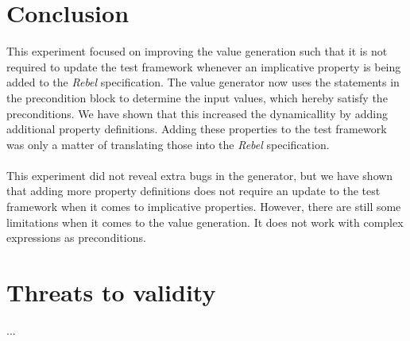 \section{Conclusion}
This experiment focused on improving the value generation such that it is not required to update the test framework whenever an implicative property is being added to the \textit{Rebel} specification. The value generator now uses the statements in the precondition block to determine the input values, which hereby satisfy the preconditions. We have shown that this increased the dynamicallity by adding additional property definitions. Adding these properties to the test framework was only a matter of translating those into the \textit{Rebel} specification.\\
\\
This experiment did not reveal extra bugs in the generator, but we have shown that adding more property definitions does not require an update to the test framework when it comes to implicative properties. However, there are still some limitations when it comes to the value generation. It does not work with complex expressions as preconditions.

\section{Threats to validity}

...
